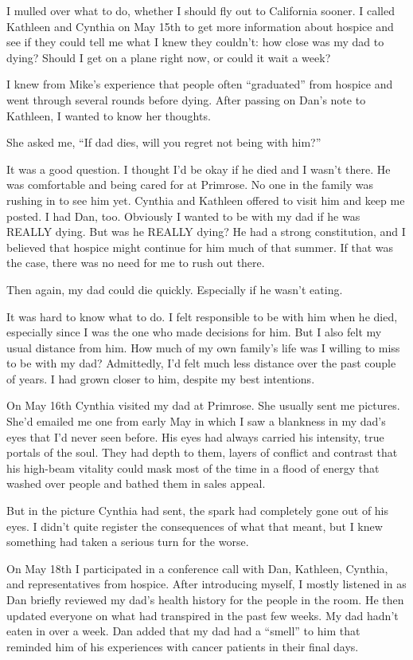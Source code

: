 \documentclass[12pt]{book}
\begin{document}
I mulled over what to do, whether I should fly out to California sooner. I called Kathleen and Cynthia on May 15th to get more information about hospice and see if they could tell me what I knew they couldn't: how close was my dad to dying? Should I get on a plane right now, or could it wait a week?

I knew from Mike's experience that people often ``graduated'' from hospice and went through several rounds before dying. After passing on Dan's note to Kathleen, I wanted to know her thoughts.

She asked me, ``If dad dies, will you regret not being with him?''

It was a good question. I thought I'd be okay if he died and I wasn't there. He was comfortable and being cared for at Primrose. No one in the family was rushing in to see him yet. Cynthia and Kathleen offered to visit him and keep me posted. I had Dan, too. Obviously I wanted to be with my dad if he was REALLY dying. But was he REALLY dying? He had a strong constitution, and I believed that hospice might continue for him much of that summer. If that was the case, there was no need for me to rush out there.

Then again, my dad could die quickly. Especially if he wasn't eating.

It was hard to know what to do. I felt responsible to be with him when he died, especially since I was the one who made decisions for him. But I also felt my usual distance from him. How much of my own family's life was I willing to miss to be with my dad? Admittedly, I'd felt much less distance over the past couple of years. I had grown closer to him, despite my best intentions.

On May 16th Cynthia visited my dad at Primrose. She usually sent me pictures. She'd emailed me one from early May in which I saw a blankness in my dad's eyes that I'd never seen before. His eyes had always carried his intensity, true portals of the soul. They had depth to them, layers of conflict and contrast that his high-beam vitality could mask most of the time in a flood of energy that washed over people and bathed them in sales appeal.

But in the picture Cynthia had sent, the spark had completely gone out of his eyes. I didn't quite register the consequences of what that meant, but I knew something had taken a serious turn for the worse.

On May 18th I participated in a conference call with Dan, Kathleen, Cynthia, and representatives from hospice. After introducing myself, I mostly listened in as Dan briefly reviewed my dad's health history for the people in the room. He then updated everyone on what had transpired in the past few weeks. My dad hadn't eaten in over a week. Dan added that my dad had a ``smell'' to him that reminded him of his experiences with cancer patients in their final days.
\end{document}
